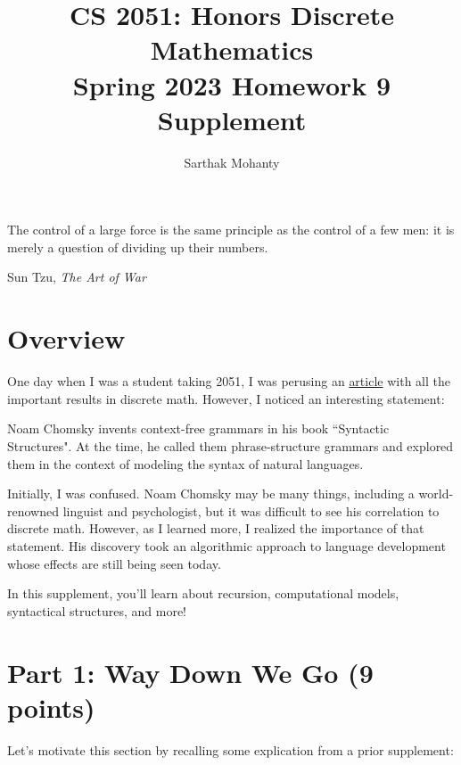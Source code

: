\documentclass{article}
\title{\vspace{-1cm}CS 2051: Honors Discrete Mathematics \\Spring 2023 Homework 9 Supplement}
\author{Sarthak Mohanty}
\date{}
\begin{document}
\maketitle

\setlength{\epigraphwidth}{0.6\textwidth}
\epigraph{

The control of a large force is the same principle as the control of a few men: it is merely a question of dividing up their numbers.}{Sun Tzu, \textit{The Art of War}}

\section*{Overview}
    One day when I was a student taking 2051, I was perusing an \href{https://web.stanford.edu/class/archive/cs/cs103/cs103.1234/timeline_of_results}{article} with all the important results in discrete math. However, I noticed an interesting statement: 

    \begin{tcolorbox}
        Noam Chomsky invents context-free grammars in his book “Syntactic Structures". At the time, he called them phrase-structure grammars and explored them in the context of modeling the syntax of natural languages.
    \end{tcolorbox}
    Initially, I was confused. Noam Chomsky may be many things, including a world-renowned linguist and psychologist, but it was difficult to see his correlation to discrete math. However, as I learned more, I realized the importance of that statement. His discovery took an algorithmic approach to language development whose effects are still being seen today.

    \vspace{2mm}
    
    In this supplement, you'll learn about recursion, computational models, syntactical structures, and more!

\section*{Part 1: Way Down We Go (9 points)}
Let's motivate this section by recalling some explication from a prior supplement:

    \begin{center}
    \end{center}
\end{document}
